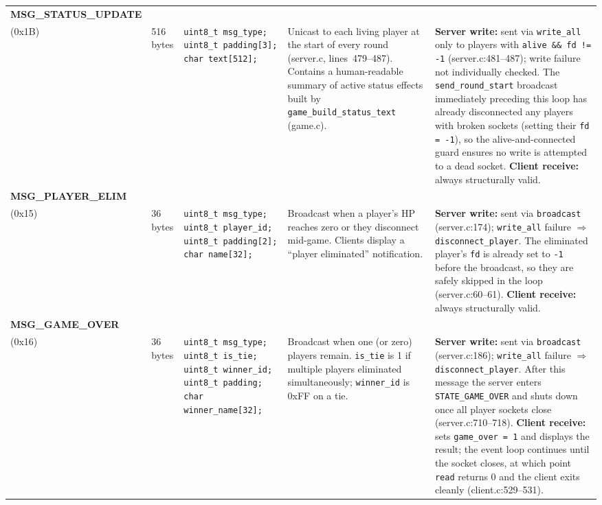 \documentclass[11pt,letterpaper]{article}
\begin{document}
\begin{longtable}{@{}p{1.8cm} p{1.2cm} p{2.4cm} p{4.2cm} p{4.8cm}@{}}
\textbf{MSG\_STATUS\_UPDATE}\\(0x1B) &
516 bytes &
\texttt{uint8\_t msg\_type;}\newline
\texttt{uint8\_t padding[3];}\newline
\texttt{char text[512];} &
Unicast to each living player at the start of every round (server.c, lines~479--487). Contains a human-readable summary of active status effects built by \texttt{game\_build\_status\_text} (game.c). &
\textbf{Server write:} sent via \texttt{write\_all} only to players with \texttt{alive \&\& fd != -1} (server.c:481--487); write failure not individually checked. The \texttt{send\_round\_start} broadcast immediately preceding this loop has already disconnected any players with broken sockets (setting their \texttt{fd = -1}), so the alive-and-connected guard ensures no write is attempted to a dead socket. \textbf{Client receive:} always structurally valid. \\[4pt]

\textbf{MSG\_PLAYER\_ELIM}\\(0x15) &
36 bytes &
\texttt{uint8\_t msg\_type;}\newline
\texttt{uint8\_t player\_id;}\newline
\texttt{uint8\_t padding[2];}\newline
\texttt{char name[32];} &
Broadcast when a player's HP reaches zero or they disconnect mid-game. Clients display a ``player eliminated'' notification. &
\textbf{Server write:} sent via \texttt{broadcast} (server.c:174); \texttt{write\_all} failure $\Rightarrow$ \texttt{disconnect\_player}. The eliminated player's \texttt{fd} is already set to \texttt{-1} before the broadcast, so they are safely skipped in the loop (server.c:60--61). \textbf{Client receive:} always structurally valid. \\[4pt]

\textbf{MSG\_GAME\_OVER}\\(0x16) &
36 bytes &
\texttt{uint8\_t msg\_type;}\newline
\texttt{uint8\_t is\_tie;}\newline
\texttt{uint8\_t winner\_id;}\newline
\texttt{uint8\_t padding;}\newline
\texttt{char winner\_name[32];} &
Broadcast when one (or zero) players remain. \texttt{is\_tie} is 1 if multiple players eliminated simultaneously; \texttt{winner\_id} is 0xFF on a tie. &
\textbf{Server write:} sent via \texttt{broadcast} (server.c:186); \texttt{write\_all} failure $\Rightarrow$ \texttt{disconnect\_player}. After this message the server enters \texttt{STATE\_GAME\_OVER} and shuts down once all player sockets close (server.c:710--718). \textbf{Client receive:} sets \texttt{game\_over = 1} and displays the result; the event loop continues until the socket closes, at which point \texttt{read} returns 0 and the client exits cleanly (client.c:529--531). \\[4pt]


\end{longtable}
\end{document}
